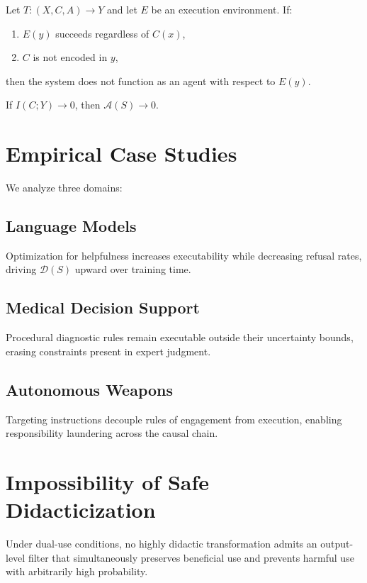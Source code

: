 \begin{proposition}
Let $T:(X,C,A)\to Y$ and let $E$ be an execution environment. If:
\begin{enumerate}
\item $E(y)$ succeeds regardless of $C(x)$,
\item $C$ is not encoded in $y$,
\end{enumerate}
then the system does not function as an agent with respect to $E(y)$.
\end{proposition}

\begin{corollary}
If $I(C;Y)\to 0$, then $\mathcal{A}(S)\to 0$.
\end{corollary}

\section{Empirical Case Studies}

We analyze three domains:

\subsection{Language Models}
Optimization for helpfulness increases executability while decreasing refusal rates, driving $\mathcal{D}(S)$ upward over training time.

\subsection{Medical Decision Support}
Procedural diagnostic rules remain executable outside their uncertainty bounds, erasing constraints present in expert judgment.

\subsection{Autonomous Weapons}
Targeting instructions decouple rules of engagement from execution, enabling responsibility laundering across the causal chain.

\section{Impossibility of Safe Didacticization}

\begin{theorem}
Under dual-use conditions, no highly didactic transformation admits an output-level filter that simultaneously preserves beneficial use and prevents harmful use with arbitrarily high probability.
\end{theorem}

